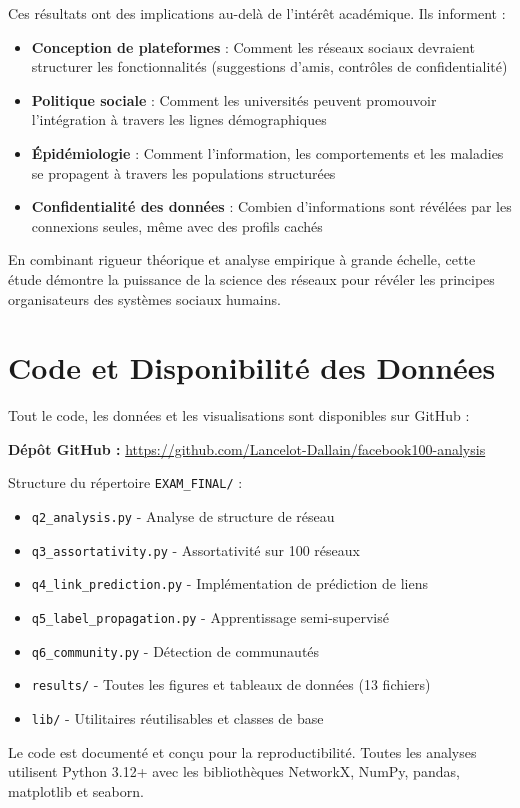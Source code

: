 \documentclass[12pt,a4paper]{article}
\begin{document}
Ces résultats ont des implications au-delà de l'intérêt académique. Ils informent :
\begin{itemize}
    \item \textbf{Conception de plateformes} : Comment les réseaux sociaux devraient structurer les fonctionnalités (suggestions d'amis, contrôles de confidentialité)
    \item \textbf{Politique sociale} : Comment les universités peuvent promouvoir l'intégration à travers les lignes démographiques
    \item \textbf{Épidémiologie} : Comment l'information, les comportements et les maladies se propagent à travers les populations structurées
    \item \textbf{Confidentialité des données} : Combien d'informations sont révélées par les connexions seules, même avec des profils cachés
\end{itemize}

En combinant rigueur théorique et analyse empirique à grande échelle, cette étude démontre la puissance de la science des réseaux pour révéler les principes organisateurs des systèmes sociaux humains.

\section*{Code et Disponibilité des Données}

Tout le code, les données et les visualisations sont disponibles sur GitHub :

\textbf{Dépôt GitHub :} \url{https://github.com/Lancelot-Dallain/facebook100-analysis}

Structure du répertoire \texttt{EXAM\_FINAL/} :
\begin{itemize}
    \item \texttt{q2\_analysis.py} - Analyse de structure de réseau
    \item \texttt{q3\_assortativity.py} - Assortativité sur 100 réseaux
    \item \texttt{q4\_link\_prediction.py} - Implémentation de prédiction de liens
    \item \texttt{q5\_label\_propagation.py} - Apprentissage semi-supervisé
    \item \texttt{q6\_community.py} - Détection de communautés
    \item \texttt{results/} - Toutes les figures et tableaux de données (13 fichiers)
    \item \texttt{lib/} - Utilitaires réutilisables et classes de base
\end{itemize}

Le code est documenté et conçu pour la reproductibilité. Toutes les analyses utilisent Python 3.12+ avec les bibliothèques NetworkX, NumPy, pandas, matplotlib et seaborn.
\end{document}
